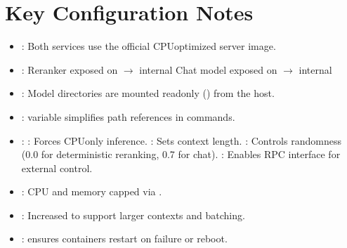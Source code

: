\documentclass[letterpaper,10pt,english]{sphinxmanual}
\begin{document}
\section{Key Configuration Notes}
\label{\detokenize{multiple-models-llamacpp:key-configuration-notes}}\begin{itemize}
\item {} 
\sphinxAtStartPar
{}: Both services use the official CPU\sphinxhyphen{}optimized  server image.

\item {} 
\sphinxAtStartPar
{}:
\sphinxhyphen{} Reranker exposed on  \(\rightarrow\) internal 
\sphinxhyphen{} Chat model exposed on  \(\rightarrow\) internal 

\item {} 
\sphinxAtStartPar
{}: Model directories are mounted read\sphinxhyphen{}only () from the host.

\item {} 
\sphinxAtStartPar
{}:  variable simplifies path references in commands.

\item {} 
\sphinxAtStartPar
{}:
\sphinxhyphen{} : Forces CPU\sphinxhyphen{}only inference.
\sphinxhyphen{} : Sets context length.
\sphinxhyphen{} : Controls randomness (0.0 for deterministic reranking, 0.7 for chat).
\sphinxhyphen{} : Enables RPC interface for external control.

\item {} 
\sphinxAtStartPar
{}: CPU and memory capped via .

\item {} 
\sphinxAtStartPar
{}: Increased to support larger contexts and batching.

\item {} 
\sphinxAtStartPar
{}:  ensures containers restart on failure or reboot.

\end{itemize}
\end{document}
